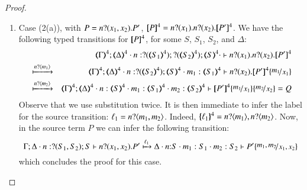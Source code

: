 \begin{proof}
\begin{enumerate}[1.]

\item Case (2(a)), with $P =  n ? (x_1, x_2) . P' $, 
$\map{P}^{4} = 
		\binp{n}{x_1}  \binp{n}{x_2}  \map{P'}^{4}$.
		We have  the following typed transitions for $[\!\![P]\!\!]^{4}$, for some $S$, $S_1$, $S_2$, and $\Delta$:
\begin{eqnarray*}
& & \mapt{\Gamma}^{4}; 
\mapt{\Delta}^{4} \cat 
n:\btinp{\tmap{S_1}{4}}\btinp{\tmap{S_2}{4}}\tmap{S}{4} \cat
\proves 
\binp{n}{x_1} \binp{n}{x_2}\map{P'}^{4} \\
& \hby{\bactinp{n}{m_1}} & 
\mapt{\Gamma}^{4}; 
\mapt{\Delta}^{4} \cat 
n:\btinp{\tmap{S_2}{4}}\tmap{S}{4} \cat
m_1:\mapt{S_1}^{4}
\proves 
\binp{n}{x_2}\map{P'}^{4} \subst{m_1}{x_1} \\
& \hby{\bactinp{n}{m_2}} & 
\mapt{\Gamma}^{4}; 
\mapt{\Delta}^{4} \cat n:\tmap{S}{4} \cat
m_1:  \mapt{S_1}^{4} \cat
m_2: \mapt{S_2}^{4}
\proves 
\map{P'}^{4} \subst{m_1}{x_1}\subst{m_2}{x_2} = Q
\end{eqnarray*}
Observe that we use substitution %
twice.
It is then immediate to infer the label for the source transition:
$\ell_1 = n ? \langle m_1,m_2 \rangle$. Indeed, $\{\!\!\{\ell_1\}\!\!\}^{4} = n ? \langle m_1 \rangle, n ? \langle m_2 \rangle$.
Now, in the source term $P$ we can infer the following transition:
$$
\stytra{\Gamma}{\ell_1}{\Delta \cat n:\btinp{S_1, S_2}S}{\binp{n}{x_1, x_2} P' }{\Delta\cat n{:}S \cat m_1:S_1 \cat m_2:S_2}{P'\subst{m_1,m_2}{x_1, x_2}}
$$
which concludes the proof for this case.



\end{enumerate}
\end{proof}
